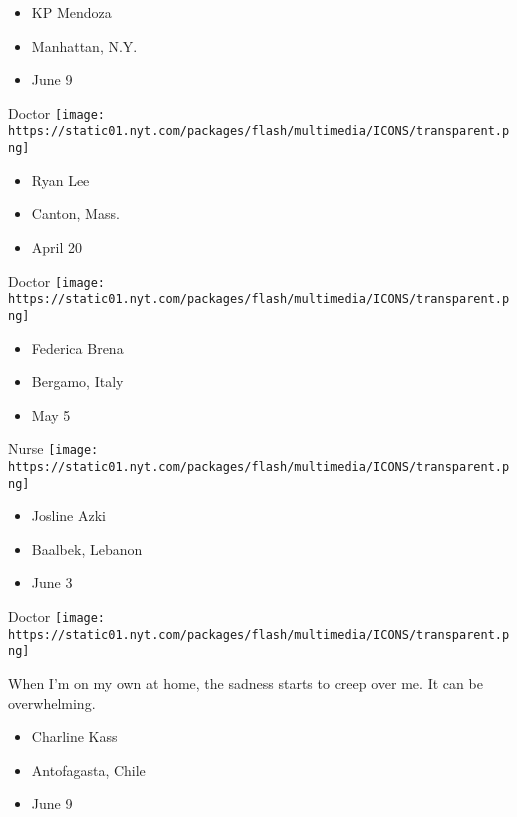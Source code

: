 \begin{itemize}
\tightlist
\item
  KP Mendoza
\item
  Manhattan, N.Y.
\item
  June 9
\end{itemize}

\protect\hyperlink{item-ryan-lee}{}

Doctor
\texttt{[image: https://static01.nyt.com/packages/flash/multimedia/ICONS/transparent.png]}

\begin{itemize}
\tightlist
\item
  Ryan Lee
\item
  Canton, Mass.
\item
  April 20
\end{itemize}

\protect\hyperlink{item-federica-brena}{}

Doctor
\texttt{[image: https://static01.nyt.com/packages/flash/multimedia/ICONS/transparent.png]}

\begin{itemize}
\tightlist
\item
  Federica Brena
\item
  Bergamo, Italy
\item
  May 5
\end{itemize}

\protect\hyperlink{item-josline-azki}{}

Nurse
\texttt{[image: https://static01.nyt.com/packages/flash/multimedia/ICONS/transparent.png]}

\begin{itemize}
\tightlist
\item
  Josline Azki
\item
  Baalbek, Lebanon
\item
  June 3
\end{itemize}

\protect\hyperlink{item-charline-kass}{}

Doctor
\texttt{[image: https://static01.nyt.com/packages/flash/multimedia/ICONS/transparent.png]}

When I'm on my own at home, the sadness starts to creep over me. It can
be overwhelming.

\begin{itemize}
\tightlist
\item
  Charline Kass
\item
  Antofagasta, Chile
\item
  June 9
\end{itemize}

